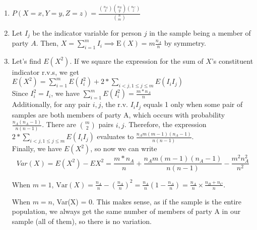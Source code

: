 \begin{enumerate}[label=(\alph*)]
\item $P(X=x,Y=y,Z=z) = \frac{\binom{n_{A}}{x}\binom{n_{B}}{y}\binom{n_{C}}{z}}
{\binom{n}{m}}$

\item Let $I_{j}$ be the indicator variable for person $j$ in the sample being a
member of party $A$. Then, $X = \sum_{i=1}^{m}I_{i} \implies \text{E}(X) =
m\frac{n_{A}}{n}$ by symmetry.

\item Let's find \(E(X^{2})\). If we square the expression for the sum of \(X\)'s constituent indicator r.v.s, we get\\

\(E(X^{2}) = \sum_{i=1}^{m}E(I_{i}^{2}) + 2*\sum_{i < j, 1 \leq j \leq m}E(I_{i}I_{j})\)\\


Since \(I_{i}^{2} = I_{i}\), we have \(\sum_{i=1}^{m}E(I_{i}^{2}) = \frac{m*n_{A}}{n}\)\\

Additionally, for any pair \(i,j\), the r.v. \(I_{i}I_{j}\) equals 1 only when some pair of samples are both members of party A, which occurs with probability \(\frac{n_{A}(n_{A}-1)}{n(n-1)}\). There are \({m \choose 2}\) pairs \(i,j\). Therefore, the expression \(2*\sum_{i < j, 1 \leq j \leq m}E(I_{i}I_{j})\) evaluates to \(\frac{n_{A}m(m-1)(n_{A}-1)}{n(n-1)}\).\\

Finally, we have \(E(X^{2})\), so now we can write \[Var(X) = E(X^{2})-EX^{2}= \frac{m*n_{A}}{n} + \frac{n_{A}m(m-1)(n_{A}-1)}{n(n-1)} - \frac{m^{2}n_{A}^{2}}{n^{2}}\]

When $m=1$, $\text{Var}(X) = \frac{n_{A}}{n} - (\frac{n_{A}}{n})^{2} = \frac{n_
{A}}{n}(1 - \frac{n_{A}}{n}) = \frac{n_{A}}{n} \times \frac{n_{B} + n_{C}}{n}$.

When $m=n$, Var(X) = 0. This makes sense, as if the sample is the entire population, we always get the same number of members of party A in our sample (all of them), so there is no variation. 
\end{enumerate}
